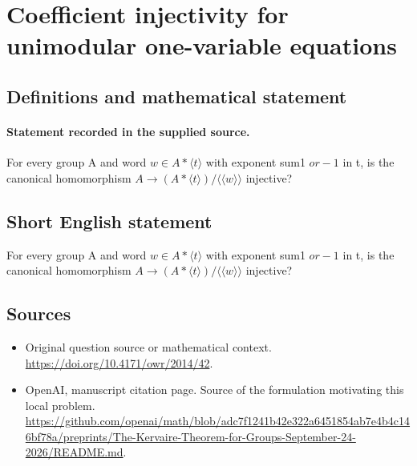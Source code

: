 \documentclass[11pt]{article}
\begin{document}
\section*{Coefficient injectivity for unimodular one-variable equations}\label{statement}
\subsection{Definitions and mathematical statement}
\paragraph{Statement recorded in the supplied source.}
For every group A and word $w\in A*\langle t\rangle $ with exponent sum1 $or-1$ in t, is the canonical homomorphism $A\to (A*\langle t\rangle )/\langle \langle w\rangle \rangle $ injective?
\subsection{Short English statement}
For every group A and word $w\in A*\langle t\rangle $ with exponent sum1 $or-1$ in t, is the canonical homomorphism $A\to (A*\langle t\rangle )/\langle \langle w\rangle \rangle $ injective?
\subsection{Sources}
\begin{itemize}
\item[S1] Original question source or mathematical context.
\url{https://doi.org/10.4171/owr/2014/42}.
\item[S2] OpenAI, manuscript citation page. Source of the formulation motivating this local problem.
\url{https://github.com/openai/math/blob/adc7f1241b42e322a6451854ab7e4b4c146bf78a/preprints/The-Kervaire-Theorem-for-Groups-September-24-2026/README.md}.
\end{itemize}
\end{document}
